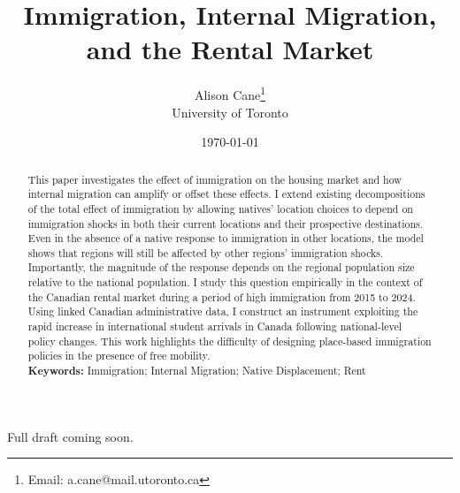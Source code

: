 \documentclass[letterpaper,12pt]{article}
\begin{document}
\begin{titlepage}
\title{Immigration, Internal Migration, and the Rental Market}
\author{Alison Cane\thanks{Email: a.cane@mail.utoronto.ca}\\ University of Toronto}

\date{\today}
\maketitle
\begin{abstract}
    \noindent This paper investigates the effect of immigration on the housing market and how internal migration can amplify or offset these effects. I extend existing decompositions of the total effect of immigration by allowing natives' location choices to depend on immigration shocks in both their current locations and their prospective destinations. Even in the absence of a native response to immigration in other locations, the model shows that regions will still be affected by other regions' immigration shocks. Importantly, the magnitude of the response depends on the regional population size relative to the national population. I study this question empirically in the context of the Canadian rental market during a period of high immigration from 2015 to 2024. Using linked Canadian administrative data, I construct an instrument exploiting the rapid increase in international student arrivals in Canada following national-level policy changes. This work highlights the difficulty of designing place-based immigration policies in the presence of free mobility.\\
    \vspace{0.25in}
    \noindent\textbf{Keywords:} Immigration; Internal Migration; Native Displacement; Rent
    \bigskip
\end{abstract}
Full draft coming soon.
\setcounter{page}{0}
\thispagestyle{empty}
\end{titlepage}
\end{document}
